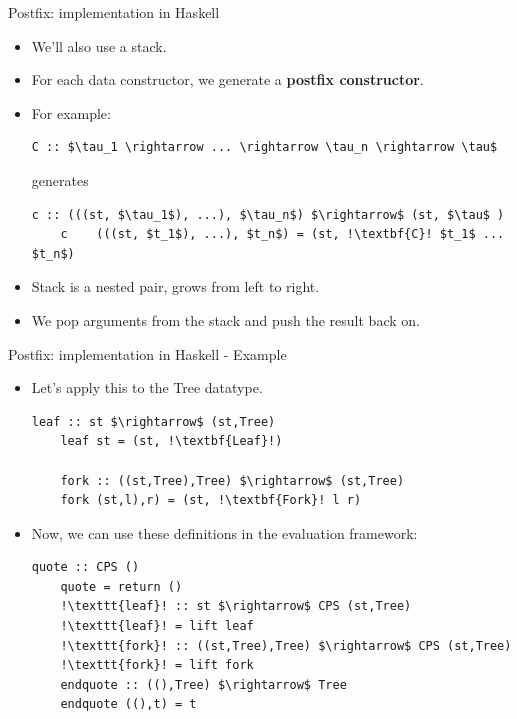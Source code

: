 \documentclass[10pt]{beamer}
\begin{document}
\begin{frame}[fragile]{Postfix: implementation in Haskell}

\begin{itemize}

\item We'll also use a stack.
\item For each data constructor, we generate a \textbf{postfix constructor}.
\item For example:
\begin{lstlisting}[mathescape=true]
	C :: $\tau_1 \rightarrow ... \rightarrow \tau_n \rightarrow \tau$
\end{lstlisting}
generates
\begin{lstlisting}[mathescape=true, escapechar=!]
	c :: (((st, $\tau_1$), ...), $\tau_n$) $\rightarrow$ (st, $\tau$ )
	c    (((st, $t_1$), ...), $t_n$) = (st, !\textbf{C}! $t_1$ ... $t_n$)
\end{lstlisting}
\item Stack is a nested pair, grows from left to right.
\item We pop arguments from the stack and push the result back on.
\end{itemize}

\end{frame}

\begin{frame}[fragile]{Postfix: implementation in Haskell - Example}

\begin{itemize}

\item Let's apply this to the Tree datatype.

\begin{lstlisting}[mathescape=true, escapechar=!]
	leaf :: st $\rightarrow$ (st,Tree)
	leaf st = (st, !\textbf{Leaf}!)
	
	fork :: ((st,Tree),Tree) $\rightarrow$ (st,Tree)
	fork (st,l),r) = (st, !\textbf{Fork}! l r)
\end{lstlisting}

\item Now, we can use these definitions in the evaluation framework:

\begin{lstlisting}[mathescape=true, escapechar=!]
	quote :: CPS ()
	quote = return ()
	!\texttt{leaf}! :: st $\rightarrow$ CPS (st,Tree)
	!\texttt{leaf}! = lift leaf
	!\texttt{fork}! :: ((st,Tree),Tree) $\rightarrow$ CPS (st,Tree)
	!\texttt{fork}! = lift fork
	endquote :: ((),Tree) $\rightarrow$ Tree
	endquote ((),t) = t
\end{lstlisting}

\end{itemize}

\end{frame}
\end{document}

